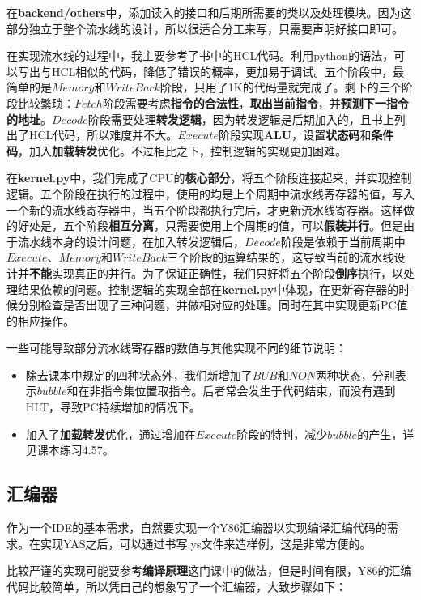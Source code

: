 \documentclass[a4paper,11pt,UTF8]{ctexart}
\begin{document}
\begin{sloppypar}
在{\bf backend/others}中，添加读入的接口和后期所需要的类以及处理模块。因为这部分独立于整个流水线的设计，所以很适合分工来写，只需要声明好接口即可。

在实现流水线的过程中，我主要参考了书中的HCL代码。利用python的语法，可以写出与HCL相似的代码，降低了错误的概率，更加易于调试。五个阶段中，最简单的是$Memory$和$WriteBack$阶段，只用了1K的代码量就完成了。剩下的三个阶段比较繁琐：$Fetch$阶段需要考虑{\bf 指令的合法性}，{\bf 取出当前指令}，并{\bf 预测下一指令的地址}。$Decode$阶段需要处理{\bf 转发逻辑}，因为转发逻辑是后期加入的，且书上列出了HCL代码，所以难度并不大。$Execute$阶段实现{\bf ALU}，设置{\bf 状态码}和{\bf 条件码}，加入{\bf 加载转发}优化。不过相比之下，控制逻辑的实现更加困难。

在{\bf kernel.py}中，我们完成了CPU的{\bf 核心部分}，将五个阶段连接起来，并实现控制逻辑。五个阶段在执行的过程中，使用的均是上个周期中流水线寄存器的值，写入一个新的流水线寄存器中，当五个阶段都执行完后，才更新流水线寄存器。这样做的好处是，五个阶段{\bf 相互分离}，只需要使用上个周期的值，可以{\bf 假装并行}。但是由于流水线本身的设计问题，在加入转发逻辑后，$Decode$阶段是依赖于当前周期中$Execute$、$Memory$和$WriteBack$三个阶段的运算结果的，这导致当前的流水线设计并{\bf 不能}实现真正的并行。为了保证正确性，我们只好将五个阶段{\bf 倒序}执行，以处理结果依赖的问题。控制逻辑的实现全部在{\bf kernel.py}中体现，在更新寄存器的时候分别检查是否出现了三种问题，并做相对应的处理。同时在其中实现更新PC值的相应操作。

一些可能导致部分流水线寄存器的数值与其他实现不同的细节说明：
\begin{itemize}
\item 除去课本中规定的四种状态外，我们新增加了$BUB$和$NON$两种状态，分别表示$bubble$和在非指令集位置取指令。后者常会发生于代码结束，而没有遇到HLT，导致PC持续增加的情况下。
\item 加入了{\bf 加载转发}优化，通过增加在$Execute$阶段的特判，减少$bubble$的产生，详见课本练习4.57。
\end{itemize}

\subsection{{\bf 汇编器}}

作为一个IDE的基本需求，自然要实现一个Y86汇编器以实现编译汇编代码的需求。在实现YAS之后，可以通过书写.ys文件来造样例，这是非常方便的。

比较严谨的实现可能要参考{\bf 编译原理}这门课中的做法，但是时间有限，Y86的汇编代码比较简单，所以凭自己的想象写了一个汇编器，大致步骤如下：


\end{sloppypar}
\end{document}
